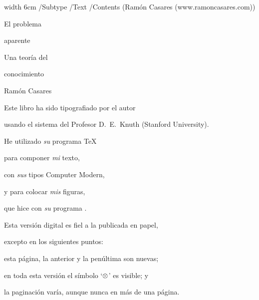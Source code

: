 
\pdfcode%
 \pdfannot width 6cm {/Subtype /Text
  /Contents (Ramón Casares (www.ramoncasares.com))}
\pdfendcode


\nopagenumbers
\background
\pdfWhite

\hbox{}
\vskip1.3in
\centerline{\ptitlefont El problema}
\vskip1pc
\centerline{\ptitlefont aparente}

\vskip10pc
\centerline{\psubtitlefont Una teoría del}
\vskip6pt
\centerline{\psubtitlefont conocimiento}

\vskip2pc
\centerline{\pauthorfont Ramón Casares}
\pdfBlack

\vfil

\break %

\null \vfill

 Este libro ha sido tipografiado por el autor\par
 usando el sistema del Profesor D.~E.~Knuth (Stanford University).\par
 He utilizado {\em su} programa \TeX\par
 para componer {\em mi} texto,\par
 con {\em sus} tipos Computer Modern,\par
 y para colocar {\em mis} figuras,\par
 que hice con {\em su} programa \METAFONT.\par

\vglue 2pc

Esta versión digital es fiel a la publicada en papel,\par
excepto en los siguientes puntos:\par
esta página, la anterior y la penúltima son nuevas;\par 
en toda esta versión el símbolo `$\prl$' es visible; y\par
la paginación varía, aunque nunca en más de una página.\par

\vglue 2pc

\def\epaversion{\the\year.%
 \ifnum\month<10 0\fi \the\month.%
 \ifnum\day<10 0\fi\the\day:%
  \count255=\time \divide\count255 by 60
 \ifnum\count255<10 0\fi \the\count255.%
  \multiply\count255 by 60 \advance\count255 by -\time
  \multiply\count255 by -1
 \ifnum\count255<10 0\fi \the\count255}

